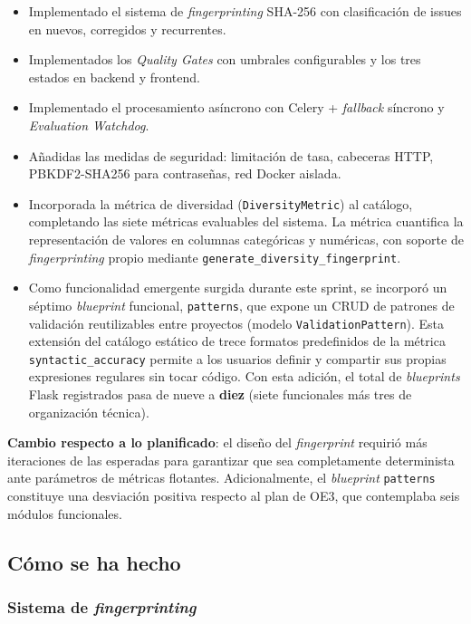 \begin{itemize}
  \item Implementado el sistema de \emph{fingerprinting} SHA-256 con
    clasificación de issues en nuevos, corregidos y recurrentes.
  \item Implementados los \emph{Quality Gates} con umbrales configurables y
    los tres estados en backend y frontend.
  \item Implementado el procesamiento asíncrono con Celery + \emph{fallback}
    síncrono y \emph{Evaluation Watchdog}.
  \item Añadidas las medidas de seguridad: limitación de tasa, cabeceras HTTP,
    PBKDF2-SHA256 para contraseñas, red Docker aislada.
  \item Incorporada la métrica de diversidad (\texttt{DiversityMetric}) al
    catálogo, completando las siete métricas evaluables del sistema.  La
    métrica cuantifica la representación de valores en columnas categóricas y
    numéricas, con soporte de \emph{fingerprinting} propio mediante
    \texttt{generate\_diversity\_fingerprint}.
  \item Como funcionalidad emergente surgida durante este sprint, se incorporó
    un séptimo \emph{blueprint} funcional, \texttt{patterns}, que expone un
    \ac{CRUD} de patrones de validación reutilizables entre proyectos
    (modelo \texttt{ValidationPattern}).  Esta extensión del catálogo
    estático de trece formatos predefinidos de la métrica
    \texttt{syntactic\_accuracy} permite a los usuarios definir y compartir
    sus propias expresiones regulares sin tocar código.  Con esta adición,
    el total de \emph{blueprints} Flask registrados pasa de nueve a
    \textbf{diez} (siete funcionales más tres de organización técnica).
\end{itemize}

\textbf{Cambio respecto a lo planificado}: el diseño del
\emph{fingerprint} requirió más iteraciones de las esperadas para
garantizar que sea completamente determinista ante parámetros de métricas
flotantes.  Adicionalmente, el \emph{blueprint} \texttt{patterns}
constituye una desviación positiva respecto al plan de OE3, que
contemplaba seis módulos funcionales.

\subsection{Cómo se ha hecho}

\subsubsection{Sistema de \emph{fingerprinting}}
\label{sec:impl-fingerprinting}

